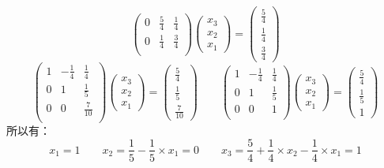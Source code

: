 \documentclass[12pt, onecolumn]{article}
\begin{document}
{\begin{equation*}
\begin{pmatrix}
		0&\frac{5}{4}&\frac{1}{4}\\
		0&\frac{1}{4}&\frac{3}{4}\\
		\end{pmatrix}\begin{pmatrix}
		x_3\\x_2\\x_1
		\end{pmatrix}=\begin{pmatrix}
		\frac{5}{4}\\\frac{1}{4}\\\frac{3}{4}
		\end{pmatrix}
	\end{equation*}
	\begin{equation*}
		\begin{pmatrix}
		1&-\frac{1}{4}&\frac{1}{4}\\
		0&1&\frac{1}{5}\\
		0&0&\frac{7}{10}\\
		\end{pmatrix}\begin{pmatrix}
		x_3\\x_2\\x_1
		\end{pmatrix}=\begin{pmatrix}
		\frac{5}{4}\\\frac{1}{5}\\\frac{7}{10}
		\end{pmatrix}
		\qquad
		\begin{pmatrix}
		1&-\frac{1}{4}&\frac{1}{4}\\
		0&1&\frac{1}{5}\\
		0&0&1\\
		\end{pmatrix}\begin{pmatrix}
		x_3\\x_2\\x_1
		\end{pmatrix}=\begin{pmatrix}
		\frac{5}{4}\\\frac{1}{5}\\1
		\end{pmatrix}
	\end{equation*}
	所以有：
	\begin{equation}
	x_1=1\qquad x_2=\frac{1}{5}-\frac{1}{5}\times x_1=0
	\qquad
	x_3=\frac{5}{4}+\frac{1}{4}\times x_2-\frac{1}{4}\times x_1=1
	\end{equation}
	}
	
	\solution{
	}
	
\end{document}
